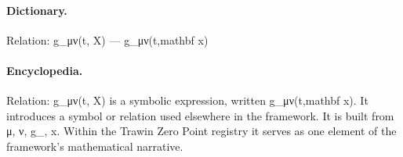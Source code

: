 \paragraph{Dictionary.}
Relation: g\_μν(t, X) — g\_μν(t,mathbf x)

\paragraph{Encyclopedia.}
Relation: g\_μν(t, X) is a symbolic expression, written g\_μν(t,mathbf x). It introduces a symbol or relation used elsewhere in the framework. It is built from μ, ν, g\_, x. Within the Trawin Zero Point registry it serves as one element of the framework's mathematical narrative.
